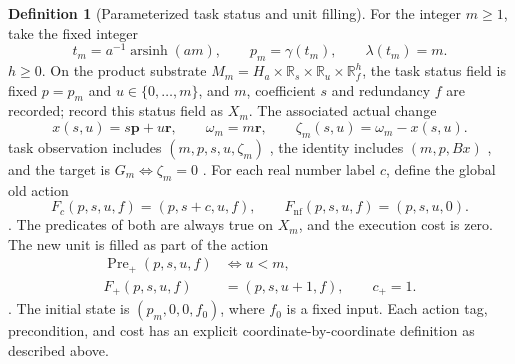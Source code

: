 \documentclass[12pt,a4paper,openany,notitlepage]{report}
\theoremstyle{plain}
\theoremstyle{definition}
\newtheorem{definition}[theorem]{Definition}
\theoremstyle{remark}
\begin{document}
\begin{CJK*}
\begin{definition}
[Parameterized task status and unit filling]\label{hgov:def:jointtask}
For the integer $m\ge1$, take the fixed integer \[
t_m=a^{-1}\operatorname{arsinh}(am),\qquad p_m=\gamma(t_m),
\qquad \lambda(t_m)=m .
\] $h\ge0$. On the product substrate $M_m=H_a\times\mathbb R_s\times\mathbb R_u\times\mathbb R_f^h$, the task status field is fixed $p=p_m$ and $u\in\{0,\ldots,m\}$, and $m$, coefficient $s$ and redundancy $f$ are recorded; record this status field as $X_m$. The associated actual change \[
x(s,u)=s\mathbf p+u\mathbf r,\qquad
\omega_m=m\mathbf r,\qquad
\zeta_m(s,u)=\omega_m-x(s,u).
\] task observation includes $(m,p,s,u,\zeta_m)$ , the identity includes $(m,p,Bx)$ , and the target is $G_m\iff \zeta_m=0$ . For each real number label $c$, define the global old action \[
 F_c(p,s,u,f)=(p,s+c,u,f),\qquad
 F_{\mathrm{nf}}(p,s,u,f)=(p,s,u,0).
\]. The predicates of both are always true on $X_m$, and the execution cost is zero. The new unit is filled as part of the action \[
 \begin{aligned}
 \operatorname{Pre}_+(p,s,u,f)&\iff u<m,\\
 F_+(p,s,u,f)&=(p,s,u+1,f),\qquad c_+=1.
 \end{aligned}
\]. The initial state is $(p_m,0,0,f_0)$, where $f_0$ is a fixed input. Each action tag, precondition, and cost has an explicit coordinate-by-coordinate definition as described above.\end{definition}



\end{CJK*}
\end{document}
